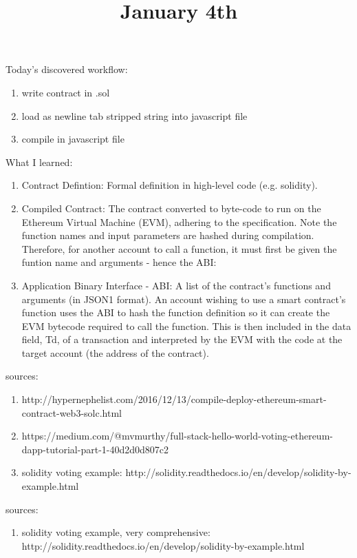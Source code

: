 Today's discovered workflow:

\begin{enumerate}
	\item write contract in .sol
	\item load as newline tab stripped string into javascript file
	\item compile in javascript file
\end{enumerate}	

What I learned:

\begin{enumerate}
	\item Contract Defintion: Formal definition in high-level code (e.g. solidity).
	\item Compiled Contract: The contract converted to byte-code to run on the Ethereum Virtual Machine (EVM), adhering to the specification. Note the function names and input parameters are hashed during compilation. Therefore, for another account to call a function, it must first be given the funtion name and arguments - hence the ABI:
	\item Application Binary Interface - ABI: A list of the contract's functions and arguments (in JSON1 format). An account wishing to use a smart contract's function uses the ABI to hash the function definition so it can create the EVM bytecode required to call the function. This is then included in the data field, Td, of a transaction and interpreted by the EVM with the code at the target account (the address of the contract).
\end{enumerate}	


sources:

\begin{enumerate}
	\item http://hypernephelist.com/2016/12/13/compile-deploy-ethereum-smart-contract-web3-solc.html
	\item https://medium.com/@mvmurthy/full-stack-hello-world-voting-ethereum-dapp-tutorial-part-1-40d2d0d807c2
	\item solidity voting example: http://solidity.readthedocs.io/en/develop/solidity-by-example.html
\end{enumerate}


\title{January 4th}

sources:

\begin{enumerate}
	\item solidity voting example, very comprehensive: http://solidity.readthedocs.io/en/develop/solidity-by-example.html
\end{enumerate}


